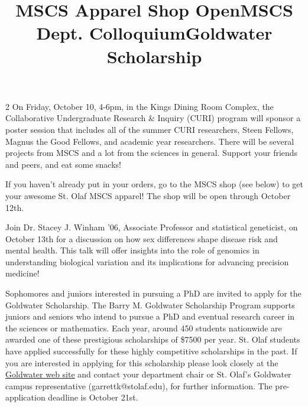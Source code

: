 \documentclass[12pt]{article}
\newcommand{\bolder}{\textbf}
\begin{document}
\begin{multicols}{2}
On Friday, October 10, 4-6pm, in the Kings Dining Room Complex, the Collaborative Undergraduate Research \& Inquiry (CURI) program will sponsor a poster session that includes all of the summer CURI researchers, Steen Fellows, Magnus the Good Fellows, and academic year researchers. There will be several projects from MSCS and a lot from the sciences in general. Support your friends and peers, and eat some snacks!

\begin{tcolorbox}[colback=white, colframe=black]
    \begin{center}
    \title{{\large \bolder{MSCS Apparel Shop Open}}}
    \end{center}
\end{tcolorbox}

If you haven't already put in your orders, go to the MSCS shop (see below) to get your awesome St. Olaf MSCS apparel! The shop will be open through October 12th. 

\begin{tcolorbox}[colback=white, colframe=black]
    \begin{center}
    \title{{\large \bolder{MSCS Dept. Colloquium}}}
    \end{center}
\end{tcolorbox}

Join Dr. Stacey J. Winham ’06, Associate Professor and statistical geneticist, on October 13th for a discussion on how sex differences shape disease risk and mental health. This talk will offer insights into the role of genomics in understanding biological variation and its implications for advancing precision medicine!

\begin{tcolorbox}[colback=white, colframe=black]
    \begin{center}
    \title{{\large \bolder{Goldwater Scholarship}}}
    \end{center}
\end{tcolorbox}

Sophomores and juniors interested in pursuing a PhD are invited to apply for the Goldwater Scholarship. The Barry M. Goldwater Scholarship Program supports juniors and seniors who intend to pursue a PhD and eventual research career in the sciences or mathematics.  Each year, around 450 students nationwide are awarded one of these prestigious scholarships of \$7500 per year. St. Olaf students have applied successfully for these highly competitive scholarships in the past. If you are interested in applying for this scholarship please look closely at the \href{https://goldwaterscholarship.gov/}{Goldwater web site} and contact your department chair or St. Olaf’s Goldwater campus representative (garrettk@stolaf.edu), for further information. The pre-application deadline is October 21st.


\end{multicols}
\end{document}
